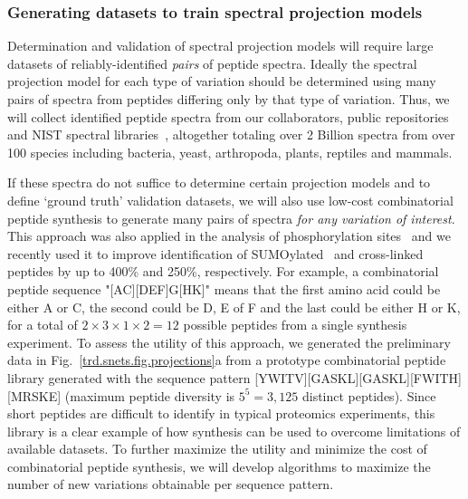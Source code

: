 \documentclass[arial,11pt]{article}
\begin{document}
\normalsize

\subsubsection{Generating datasets to train spectral projection models}\label{trd.snets.aim.sp.models}

Determination and validation of spectral projection models will require large datasets of reliably-identified {\em pairs} of peptide spectra. Ideally the spectral projection model for each type of variation should be determined using many pairs of spectra from peptides differing only by that type of variation. %
%
Thus, we will collect identified peptide spectra from our collaborators, public repositories~\cite{falkner06,desiere06,craig06,martens05} and NIST spectral libraries~\cite{speclibNist}, altogether totaling over 2 Billion spectra from over 100 species including bacteria, yeast, arthropoda, plants, reptiles and mammals.

If these spectra do not suffice to determine certain projection models and to define `ground truth' validation datasets, we will also use low-cost combinatorial peptide synthesis to generate many pairs of spectra {\em for any variation of interest}. This approach was also applied in the analysis of phosphorylation sites~\cite{aguiar10} and we recently used it to improve identification of SUMOylated~\cite{wang12sumo} and cross-linked~\cite{wang12xlink} peptides by up to 400\% and 250\%, respectively.
For example, a combinatorial peptide sequence "[AC][DEF]G[HK]" means that the first amino acid could be either A or C, the second could be D, E of F and the last could be either H or K, for a total of $2\times 3\times 1\times 2=12$ possible peptides from a single synthesis experiment. To assess the utility of this approach, we generated the preliminary data in Fig.~\ref{trd.snets.fig.projections}a from a prototype combinatorial peptide library generated with the sequence pattern [YWITV][GASKL][GASKL][FWITH][MRSKE] (maximum peptide diversity is $5^5=3,125$ distinct peptides). Since short peptides are difficult to identify in typical proteomics experiments, this library is a clear example of how synthesis can be used to overcome limitations of available datasets. To further maximize the utility and minimize the cost of combinatorial peptide synthesis, we will develop algorithms to maximize the number of new variations obtainable per sequence pattern.
\end{document}
